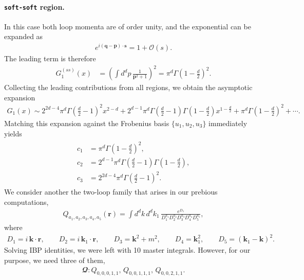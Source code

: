 \paragraph{\texttt{soft-soft} region.}
In this case both loop momenta are of order unity, and the exponential can be expanded as
\begin{align}
e^{i(\boldsymbol{q}-\boldsymbol{p})\cdot \boldsymbol{s}} = 1 + \mathcal O(s).
\end{align}
The leading term is therefore
\begin{align}
G_1^{(ss)}(x)
&=
\left(
\int d^d p\,\frac{1}{\boldsymbol{p}^2+1}
\right)^2
=
\pi^d \Gamma\!\left(1-\frac{d}{2}\right)^2.
\end{align}
Collecting the leading contributions from all regions, we obtain the asymptotic expansion
\begin{align}
G_1(x)
\sim
2^{2d-4}\pi^d
\Gamma\!\left(\frac{d}{2}-1\right)^2
x^{2-d}
+
2^{d-1}\pi^d
\Gamma\!\left(\frac{d}{2}-1\right)
\Gamma\!\left(1-\frac{d}{2}\right)
x^{1-\frac{d}{2}}
+
\pi^d
\Gamma\!\left(1-\frac{d}{2}\right)^2
+\cdots.
\end{align}
Matching this expansion against the Frobenius basis $\{u_1,u_2,u_3\}$ immediately yields
\begin{align}
\begin{split}
c_1 &= \pi^d \Gamma\!\left(1-\frac{d}{2}\right)^2, \\
c_2 &= 2^{d-1}\pi^d
\Gamma\!\left(\frac{d}{2}-1\right)
\Gamma\!\left(1-\frac{d}{2}\right), \\
c_3 &= 2^{2d-4}\pi^d
\Gamma\!\left(\frac{d}{2}-1\right)^2.
\end{split}
\end{align}
We consider another the two-loop family that arises in our prebious computations,
\begin{align}
Q_{a_1,a_2,a_3,a_4,a_5}(\boldsymbol{r})
=
\int d^d k\, d^d k_1\,
\frac{e^{D_1}}{D_1^{a_1} D_2^{a_2} D_3^{a_3} D_4^{a_4} D_5^{a_5}},
\end{align}
where
\begin{align}
D_1 = i\,\boldsymbol{k}\!\cdot\!\boldsymbol{r},
\qquad
D_2 = i\,\boldsymbol{k}_1\!\cdot\!\boldsymbol{r},
\qquad
D_3 = \boldsymbol{k}^2+m^2,
\qquad
D_4 = \boldsymbol{k}_1^2 ,
\qquad
D_5 = (\boldsymbol{k}_1-\boldsymbol{k})^2.
\end{align}
Solving IBP identities, we were left with 10 master integrals. However, for our purpose, we need three of them,
\begin{align}
    \mathbfcal{Q}:Q_{0,0,0,1,1},\,Q_{0,0,1,1,1},\, Q_{0,0,2,1,1}.
\end{align}
